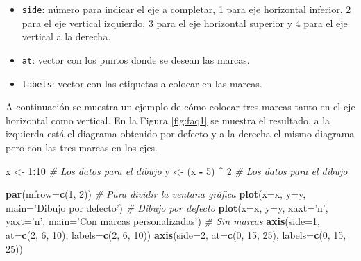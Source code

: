 \documentclass[10pt,]{krantz}
\makeatletter
\newenvironment{Shaded}{\begin{snugshade}}{\end{snugshade}}
\newcommand{\KeywordTok}[1]{\textcolor[rgb]{0.13,0.29,0.53}{\textbf{#1}}}
\newcommand{\DataTypeTok}[1]{\textcolor[rgb]{0.13,0.29,0.53}{#1}}
\newcommand{\DecValTok}[1]{\textcolor[rgb]{0.00,0.00,0.81}{#1}}
\newcommand{\StringTok}[1]{\textcolor[rgb]{0.31,0.60,0.02}{#1}}
\newcommand{\CommentTok}[1]{\textcolor[rgb]{0.56,0.35,0.01}{\textit{#1}}}
\newcommand{\OperatorTok}[1]{\textcolor[rgb]{0.81,0.36,0.00}{\textbf{#1}}}
\newcommand{\NormalTok}[1]{#1}
\providecommand{\tightlist}{%
  \setlength{\itemsep}{0pt}\setlength{\parskip}{0pt}}
\newenvironment{kframe}{%
\medskip{}
\setlength{\fboxsep}{.8em}
 \def\at@end@of@kframe{}%
 \ifinner\ifhmode%
  \def\at@end@of@kframe{\end{minipage}}%
  \begin{minipage}{\columnwidth}%
 \fi\fi%
 \def\FrameCommand##1{\hskip\@totalleftmargin \hskip-\fboxsep
 \colorbox{shadecolor}{##1}\hskip-\fboxsep
     \hskip-\linewidth \hskip-\@totalleftmargin \hskip\columnwidth}%
 \MakeFramed {\advance\hsize-\width
   \@totalleftmargin\z@ \linewidth\hsize
   \@setminipage}}%
 {\par\unskip\endMakeFramed%
 \at@end@of@kframe}
\renewenvironment{Shaded}{\begin{kframe}}{\end{kframe}}
\makeatother
\begin{document}
\begin{itemize}
\tightlist
\item
  \texttt{side}: número para indicar el eje a completar, 1 para eje
  horizontal inferior, 2 para el eje vertical izquierdo, 3 para el eje
  horizontal superior y 4 para el eje vertical a la derecha.
\item
  \texttt{at}: vector con los puntos donde se desean las marcas.
\item
  \texttt{labels}: vector con las etiquetas a colocar en las marcas.
\end{itemize}

A continuación se muestra un ejemplo de cómo colocar tres marcas tanto
en el eje horizontal como vertical. En la Figura \ref{fig:faq1} se
muestra el resultado, a la izquierda está el diagrama obtenido por
defecto y a la derecha el mismo diagrama pero con las tres marcas en los
ejes.

\begin{Shaded}
\begin{Highlighting}[]
\NormalTok{x <-}\StringTok{ }\DecValTok{1}\OperatorTok{:}\DecValTok{10}          \CommentTok{# Los datos para el dibujo}
\NormalTok{y <-}\StringTok{ }\NormalTok{(x }\OperatorTok{-}\StringTok{ }\DecValTok{5}\NormalTok{) }\OperatorTok{^}\StringTok{ }\DecValTok{2}   \CommentTok{# Los datos para el dibujo}

\KeywordTok{par}\NormalTok{(}\DataTypeTok{mfrow=}\KeywordTok{c}\NormalTok{(}\DecValTok{1}\NormalTok{, }\DecValTok{2}\NormalTok{)) }\CommentTok{# Para dividir la ventana gráfica}
\KeywordTok{plot}\NormalTok{(}\DataTypeTok{x=}\NormalTok{x, }\DataTypeTok{y=}\NormalTok{y, }\DataTypeTok{main=}\StringTok{'Dibujo por defecto'}\NormalTok{)  }\CommentTok{# Dibujo por defecto}
\KeywordTok{plot}\NormalTok{(}\DataTypeTok{x=}\NormalTok{x, }\DataTypeTok{y=}\NormalTok{y, }\DataTypeTok{xaxt=}\StringTok{'n'}\NormalTok{, }\DataTypeTok{yaxt=}\StringTok{'n'}\NormalTok{,}
     \DataTypeTok{main=}\StringTok{'Con marcas personalizadas'}\NormalTok{)  }\CommentTok{# Sin marcas}
\KeywordTok{axis}\NormalTok{(}\DataTypeTok{side=}\DecValTok{1}\NormalTok{, }\DataTypeTok{at=}\KeywordTok{c}\NormalTok{(}\DecValTok{2}\NormalTok{, }\DecValTok{6}\NormalTok{, }\DecValTok{10}\NormalTok{), }\DataTypeTok{labels=}\KeywordTok{c}\NormalTok{(}\DecValTok{2}\NormalTok{, }\DecValTok{6}\NormalTok{, }\DecValTok{10}\NormalTok{))}
\KeywordTok{axis}\NormalTok{(}\DataTypeTok{side=}\DecValTok{2}\NormalTok{, }\DataTypeTok{at=}\KeywordTok{c}\NormalTok{(}\DecValTok{0}\NormalTok{, }\DecValTok{15}\NormalTok{, }\DecValTok{25}\NormalTok{), }\DataTypeTok{labels=}\KeywordTok{c}\NormalTok{(}\DecValTok{0}\NormalTok{, }\DecValTok{15}\NormalTok{, }\DecValTok{25}\NormalTok{))}
\end{Highlighting}
\end{Shaded}
\end{document}
